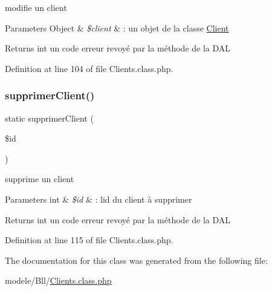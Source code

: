 modifie un client 
\begin{DoxyParams}[1]{Parameters}
Object & {\em \$client} & \+: un objet de la classe \hyperlink{class_client}{Client} \\
\hline
\end{DoxyParams}
\begin{DoxyReturn}{Returns}
int un code erreur revoyé par la méthode de la D\+AL 
\end{DoxyReturn}


Definition at line 104 of file Clients.\+class.\+php.

\mbox{\label{class_clients_a3e4d31ae69a65522e3a811adfb7b4992}} 
\subsubsection{\texorpdfstring{supprimer\+Client()}{supprimerClient()}}
{\footnotesize\ttfamily static supprimer\+Client (\begin{DoxyParamCaption}\item[{}]{\$id }\end{DoxyParamCaption})\hspace{0.3cm}{\ttfamily [static]}}

supprime un client 
\begin{DoxyParams}[1]{Parameters}
int & {\em \$id} & \+: l\textquotesingle{}id du client à supprimer \\
\hline
\end{DoxyParams}
\begin{DoxyReturn}{Returns}
int un code erreur revoyé par la méthode de la D\+AL 
\end{DoxyReturn}


Definition at line 115 of file Clients.\+class.\+php.



The documentation for this class was generated from the following file\+:\begin{DoxyCompactItemize}
\item 
modele/\+Bll/\hyperlink{_clients_8class_8php}{Clients.\+class.\+php}\end{DoxyCompactItemize}
